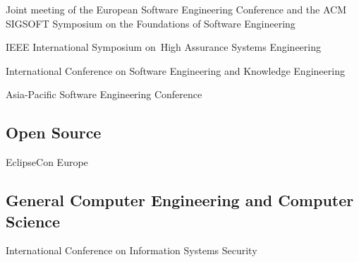 \begin{activity}{Joint meeting of the European Software Engineering Conference and the ACM SIGSOFT Symposium on the Foundations of Software Engineering}
\end{activity}

\begin{activity}{IEEE International Symposium on High Assurance Systems Engineering}
\end{activity}

\begin{activity}{International Conference on Software Engineering and Knowledge Engineering}
\end{activity}

\begin{activity}{Asia-Pacific Software Engineering Conference}
\end{activity}

\subsection{Open Source}

\begin{activity}{EclipseCon Europe}
\end{activity}

\subsection{General Computer Engineering and Computer Science}

\begin{activity}{International Conference on Information Systems Security}
\end{activity}

